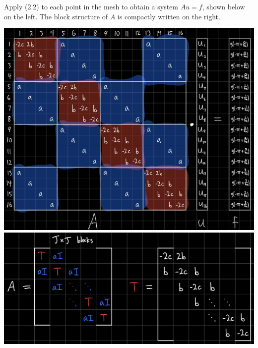 \documentclass{article}
\begin{document}
Apply (2.2) to each point in the mesh to obtain a system $Au=f$, shown below on the left. The block structure of $A$ is compactly written on the right.

\includegraphics[scale=.1]{hw6 2 full}
\includegraphics[scale=.09]{hw6 2 block}
\end{document}
